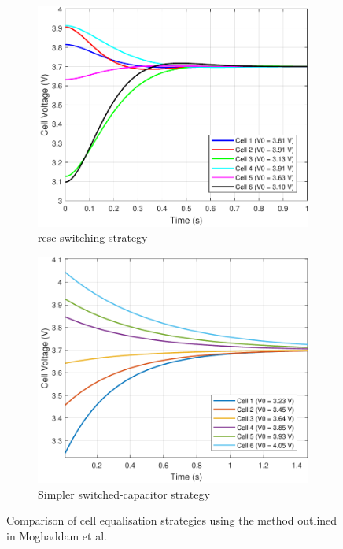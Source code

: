 \begin{figure}[H]
    \centering
    \vspace{5mm}
    \begin{subfigure}[b]{0.4\textwidth} %
        \centering
        \includegraphics[width=\textwidth]{figs/Samuel/Figures/cellV-cropped.pdf}
        \caption{\gls{resc} switching strategy}
        \label{fig:resccrop}
    \end{subfigure}
    \hspace{0.07\textwidth}
    \begin{subfigure}[b]{0.388\textwidth} %
        \centering
        \includegraphics[width=\textwidth]{figs/Samuel/Figures/recpdf-cropped.pdf}
        \caption{Simpler switched-capacitor strategy}
        \label{fig:reccrop}
    \end{subfigure}
    \caption[Comparison of Cell Equalisation Strategies]{Comparison of cell equalisation strategies using the method outlined in Moghaddam et al. \cite{8467638}}
    \label{fig:rescvrec}
\end{figure}

